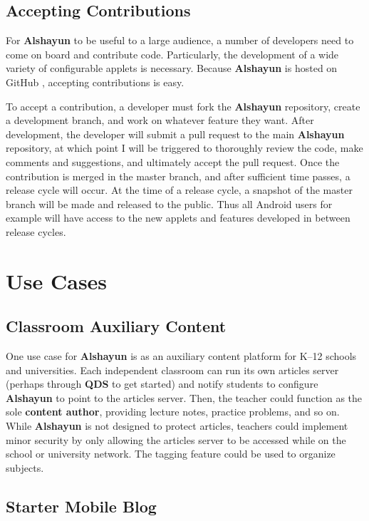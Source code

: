 \documentclass[12pt]{report}
\begin{document}
    \section{Accepting Contributions}

For \textbf{Alshayun} to be useful to a large audience, a number of developers
need to come on board and contribute code. Particularly, the development of a
wide variety of configurable applets is necessary. Because \textbf{Alshayun} is
hosted on GitHub \cite{github}, accepting contributions is easy.

To accept a contribution, a developer must fork the \textbf{Alshayun}
repository, create a development branch, and work on whatever feature they want.
After development, the developer will submit a pull request to the main
\textbf{Alshayun} repository, at which point I will be triggered to thoroughly
review the code, make comments and suggestions, and ultimately accept the pull
request. Once the contribution is merged in the master branch, and after
sufficient time passes, a release cycle will occur. At the time of a release
cycle, a snapshot of the master branch will be made and released to the public.
Thus all Android users for example will have access to the new applets and
features developed in between release cycles.

\chapter{Use Cases}

    \section{Classroom Auxiliary Content}

One use case for \textbf{Alshayun} is as an auxiliary content platform for K--12
schools and universities. Each independent classroom can run its own articles
server (perhaps through \textbf{QDS} to get started) and notify students to
configure \textbf{Alshayun} to point to the articles server. Then, the teacher
could function as the sole \textbf{content author}, providing lecture notes,
practice problems, and so on. While \textbf{Alshayun} is not designed to protect
articles, teachers could implement minor security by only allowing the articles
server to be accessed while on the school or university network. The tagging
feature could be used to organize subjects.

    \section{Starter Mobile Blog}
\end{document}
